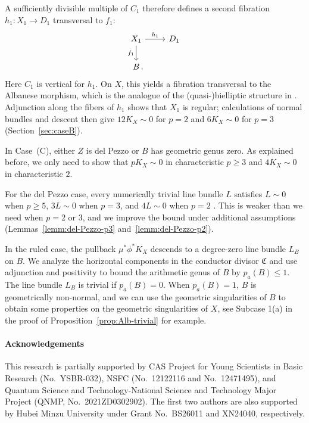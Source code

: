 \documentclass[10pt,abstract=true]{scrartcl}
\numberwithin{equation}{section}
\theoremstyle{definition}
\theoremstyle{remark}
\begin{document}
A sufficiently divisible multiple of $C_1$ therefore defines a second fibration $h_1\colon X_1\to D_1$ transversal to $f_1$:
\[
  \begin{tikzcd}
    X_1 \ar[r,"h_1"] \ar[d,"f_1"'] & D_1 \\
    B\rlap{\,.} &
  \end{tikzcd}
\]
Here $C_1$ is vertical for $h_1$.
On $X$, this yields a fibration transversal to the Albanese morphism, which is the analogue of the (quasi-)bielliptic structure in \cite{BM-II}.
Adjunction along the fibers of $h_1$ shows that $X_1$ is regular; calculations of normal bundles and descent then give $12K_X\sim0$ for $p = 2$ and $6K_X\sim0$ for $p = 3$ (Section~\ref{sec:caseB}).

\smallskip
In Case~\textup{(C)}, either $Z$ is del Pezzo or $B$ has geometric genus zero.
As explained before, we only need to show that $pK_X \sim 0$ in characteristic $p\ge3$ and $4K_X \sim 0$ in characteristic $2$.

For the del Pezzo case, every numerically trivial line bundle $L$ satisfies $L\sim0$ when $p\ge5$, $3L\sim0$ when $p=3$, and $4L\sim0$ when $p=2$ \cite[Theorem~4.1]{Bernasconi-Tanaka-22}.
This is weaker than we need when $p=2$ or $3$, and we improve the bound under additional assumptions (Lemmas~\ref{lemm:del-Pezzo-p3} and~\ref{lemm:del-Pezzo-p2}).

In the ruled case, the pullback $\mu^*\phi^*K_X$ descends to a degree-zero line bundle $L_B$ on $B$.
We analyze the horizontal components in the conductor divisor $\mathfrak C$ and use adjunction and positivity to bound the arithmetic genus of $B$ by $p_a(B) \le 1$.
The line bundle $L_B$ is trivial if $p_a(B) = 0$.
When $p_a(B) = 1$, $B$ is geometrically non-normal, and we can use the geometric singularities of $B$ to obtain some properties on the geometric singularities of $X$, see Subcase 1(a) in the proof of Proposition~\ref{prop:Alb-trivial} for example.

\medskip
\paragraph{Acknowledgements}
This research is partially supported by CAS Project for Young Scientists in Basic Research (No.~YSBR-032), NSFC (No.~12122116 and No.~12471495), and Quantum Science and Technology-National Science and Technology Major Project (QNMP, No.~2021ZD0302902). 
The first two authors are also supported by Hubei Minzu University under Grant No.~BS26011 and XN24040, respectively.
\end{document}
